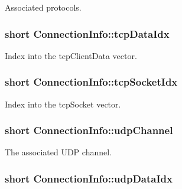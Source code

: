Associated protocols. 

\hypertarget{structConnectionInfo_ae74bd85133eb1b4c3cec7431c280fa13}{
\subsubsection[{tcp\-Data\-Idx}]{\setlength{\rightskip}{0pt plus 5cm}short Connection\-Info\-::tcp\-Data\-Idx}}\label{structConnectionInfo_ae74bd85133eb1b4c3cec7431c280fa13}


Index into the tcp\-Client\-Data vector. 

\hypertarget{structConnectionInfo_a1e837b6519e7035ad689232289931e82}{
\subsubsection[{tcp\-Socket\-Idx}]{\setlength{\rightskip}{0pt plus 5cm}short Connection\-Info\-::tcp\-Socket\-Idx}}\label{structConnectionInfo_a1e837b6519e7035ad689232289931e82}


Index into the tcp\-Socket vector. 

\hypertarget{structConnectionInfo_a04b5d2e6b358b6b9337b75dbeb01197e}{
\subsubsection[{udp\-Channel}]{\setlength{\rightskip}{0pt plus 5cm}short Connection\-Info\-::udp\-Channel}}\label{structConnectionInfo_a04b5d2e6b358b6b9337b75dbeb01197e}


The associated U\-D\-P channel. 

\hypertarget{structConnectionInfo_a77f71cc46ad9033a81184cae84170277}{
\subsubsection[{udp\-Data\-Idx}]{\setlength{\rightskip}{0pt plus 5cm}short Connection\-Info\-::udp\-Data\-Idx}}\label{structConnectionInfo_a77f71cc46ad9033a81184cae84170277}


